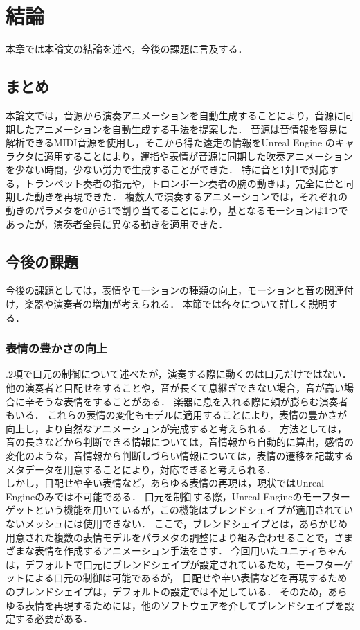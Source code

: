 \chapter{結論}
\label{chap:conclusion}
本章では本論文の結論を述べ，今後の課題に言及する．

\section{まとめ}
本論文では，音源から演奏アニメーションを自動生成することにより，音源に同期したアニメーションを自動生成する手法を提案した．
音源は音情報を容易に解析できるMIDI音源を使用し，そこから得た遠走の情報をUnreal Engine のキャラクタに適用することにより，運指や表情が音源に同期した吹奏アニメーションを少ない時間，少ない労力で生成することができた．
特に音と1対1で対応する，トランペット奏者の指元や，トロンボーン奏者の腕の動きは，完全に音と同期した動きを再現できた．
複数人で演奏するアニメーションでは，それぞれの動きのパラメタを0から1で割り当てることにより，基となるモーションは1つであったが，演奏者全員に異なる動きを適用できた．

\section{今後の課題}
今後の課題としては，表情やモーションの種類の向上，モーションと音の関連付け，楽器や演奏者の増加が考えられる．
本節では各々について詳しく説明する．

\subsection{表情の豊かさの向上}
{.2項}で口元の制御について述べたが，演奏する際に動くのは口元だけではない．
他の演奏者と目配せをすることや，音が長くて息継ぎできない場合，音が高い場合に辛そうな表情をすることがある．
楽器に息を入れる際に頬が膨らむ演奏者もいる．
これらの表情の変化もモデルに適用することにより，表情の豊かさが向上し，より自然なアニメーションが完成すると考えられる．
方法としては，音の長さなどから判断できる情報については，音情報から自動的に算出，感情の変化のような，音情報から判断しづらい情報については，表情の遷移を記載するメタデータを用意することにより，対応できると考えられる．\\
\indent
しかし，目配せや辛い表情など，あらゆる表情の再現は，現状ではUnreal Engineのみでは不可能である．
口元を制御する際，Unreal Engineのモーフターゲットという機能を用いているが，この機能はブレンドシェイプが適用されていないメッシュには使用できない．
ここで，ブレンドシェイプとは，あらかじめ用意された複数の表情モデルをパラメタの調整により組み合わせることで，さまざまな表情を作成するアニメーション手法をさす．
今回用いたユニティちゃんは，デフォルトで口元にブレンドシェイプが設定されているため，モーフターゲットによる口元の制御は可能であるが，
目配せや辛い表情などを再現するためのブレンドシェイプは，デフォルトの設定では不足している．
そのため，あらゆる表情を再現するためには，他のソフトウェアを介してブレンドシェイプを設定する必要がある．

